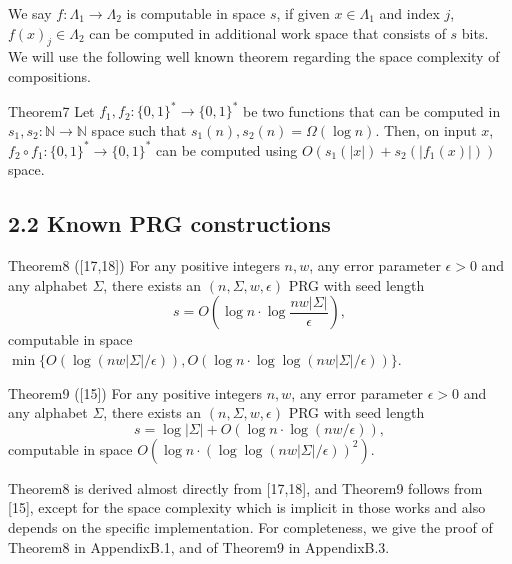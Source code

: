 We say $f:\Lambda_1\to\Lambda_2$ is computable in space $s$, if given $x\in\Lambda_1$ and index $j$, $f(x)_j\in\Lambda_2$ can be computed in additional work space that consists of $s$ bits. We will use the following well known theorem regarding the space complexity of compositions.
\begin{authorclaim}{Theorem7}
Let $f_1,f_2:\{0,1\}^*\to\{0,1\}^*$ be two functions that can be computed in $s_1,s_2:\mathbb N\to\mathbb N$ space such that $s_1(n),s_2(n)=\Omega(\log n)$. Then, on input $x$, $f_2\circ f_1:\{0,1\}^*\to\{0,1\}^*$ can be computed using $O(s_1(|x|)+s_2(|f_1(x)|))$ space.
\end{authorclaim}
\subsection*{2.2 Known PRG constructions}
\begin{authorclaim}{Theorem8 ([17,18])}
For any positive integers $n,w$, any error parameter $\epsilon>0$ and any alphabet $\Sigma$, there exists an $(n,\Sigma,w,\epsilon)$ PRG with seed length
\[s=O\left(\log n\cdot\log\frac{nw|\Sigma|}\epsilon\right),\]
computable in space $\min\{O(\log(nw|\Sigma|/\epsilon)),O(\log n\cdot\log\log(nw|\Sigma|/\epsilon))\}$.
\end{authorclaim}
\begin{authorclaim}{Theorem9 ([15])}
For any positive integers $n,w$, any error parameter $\epsilon>0$ and any alphabet $\Sigma$, there exists an $(n,\Sigma,w,\epsilon)$ PRG with seed length
\[s=\log|\Sigma|+O(\log n\cdot\log(nw/\epsilon)),\]
computable in space $O(\log n\cdot(\log\log(nw|\Sigma|/\epsilon))^2)$.
\end{authorclaim}
Theorem8 is derived almost directly from [17,18], and Theorem9 follows from [15], except for the space complexity which is implicit in those works and also depends on the specific implementation. For completeness, we give the proof of Theorem8 in AppendixB.1, and of Theorem9 in AppendixB.3.
